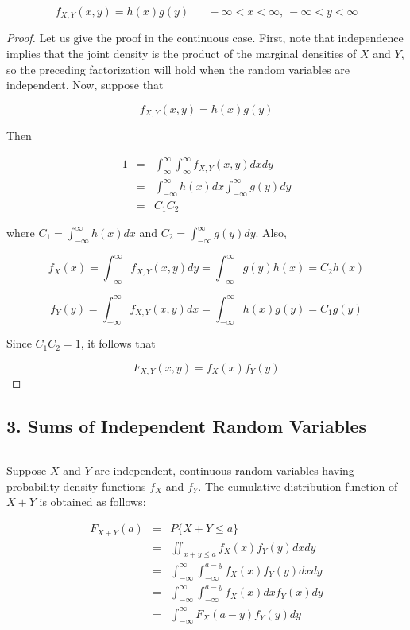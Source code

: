 $$f_{X,Y}(x,y) = h(x)g(y) \hspace{20pt} - \infty < x < \infty,~ - \infty < y < \infty$$


\begin{proof}
	Let us give the proof in the continuous case. First, note that independence implies that the joint density is the product of the marginal densities of $X$ and $Y$, so the preceding factorization will hold when the random variables are independent. Now, suppose that
	
	$$f_{X,Y}(x,y) = h(x)g(y)$$
	
	Then 
	
	\begin{eqnarray*}
		1 &=& \int^{\infty}_{\infty}\int^{\infty}_{\infty}f_{X,Y}(x,y)dxdy\\
		&=& \int^{\infty}_{-\infty}h(x)dx\int^{\infty}_{-\infty}g(y)dy\\
		&=& C_1C_2
	\end{eqnarray*}
	
	where $C_1 = \int^{\infty}_{-\infty}h(x)dx$ and $C_2 = \int^{\infty}_{-\infty}g(y)dy$. Also,
	
	$$f_X(x) = \int^{\infty}_{-\infty}  f_{X,Y}(x,y)dy = \int^{\infty}_{-\infty}g(y)h(x) =  C_2h(x)$$
	
	$$f_Y(y) = \int^{\infty}_{-\infty}f_{X,Y}(x,y)dx = \int^{\infty}_{-\infty}h(x)g(y) =  C_1g(y)$$
	
	Since $C_1C_2 = 1$, it follows that
	
	$$F_{X,Y}(x,y) = f_X(x)f_Y(y)$$
\end{proof}

\subsection*{3. Sums of Independent Random Variables}$ $

Suppose $X$ and $Y$ are independent, continuous random variables having probability density functions $f_X$ and $f_Y$. The cumulative distribution function of $X + Y$ is obtained as follows:

\begin{eqnarray*}
	F_{X + Y}(a) &=& P\{X + Y \leq a\}\\
	&=& \iint_{x + y \leq a}f_X(x)f_Y(y)dxdy\\
	&=& \int^{\infty}_{-\infty}\int^{a - y}_{-\infty}f_X(x)f_Y(y)dxdy\\
	&=& \int^{\infty}_{-\infty} \int^{a - y}_{-\infty} f_X(x)dxf_Y(x)dy\\
	&=& \int^{\infty}_{-\infty}F_X(a-y)f_Y(y)dy
\end{eqnarray*}

